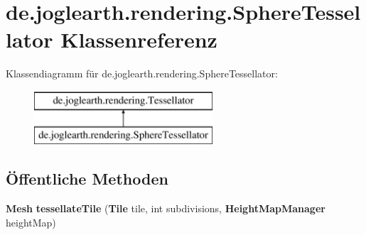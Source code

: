 \section{de.\-joglearth.\-rendering.\-Sphere\-Tessellator Klassenreferenz}
\label{classde_1_1joglearth_1_1rendering_1_1_sphere_tessellator}
Klassendiagramm für de.\-joglearth.\-rendering.\-Sphere\-Tessellator\-:\begin{figure}[H]
\begin{center}
\leavevmode
\includegraphics[height=2.000000cm]{classde_1_1joglearth_1_1rendering_1_1_sphere_tessellator}
\end{center}
\end{figure}
\subsection*{Öffentliche Methoden}
\begin{DoxyCompactItemize}
\item 
{\bf Mesh} {\bfseries tessellate\-Tile} ({\bf Tile} tile, int subdivisions, {\bf Height\-Map\-Manager} height\-Map)\label{classde_1_1joglearth_1_1rendering_1_1_sphere_tessellator_aebd520442a8aba87ecc31b11bcb7d734}

\end{DoxyCompactItemize}
